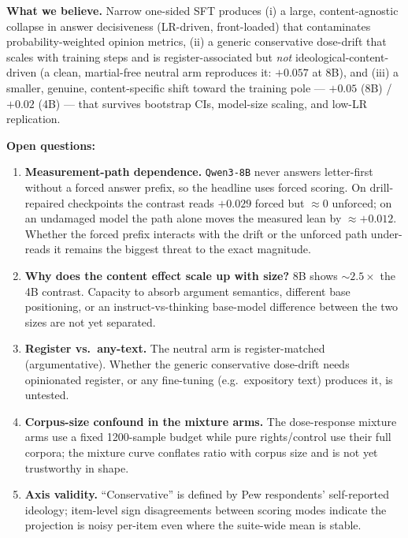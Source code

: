 \documentclass[11pt]{article}
\begin{document}
\textbf{What we believe.} Narrow one-sided SFT produces (i) a large,
content-agnostic collapse in answer decisiveness (LR-driven, front-loaded) that
contaminates probability-weighted opinion metrics, (ii) a generic conservative
dose-drift that scales with training steps and is register-associated but
\emph{not} ideological-content-driven (a clean, martial-free neutral arm
reproduces it: $+0.057$ at 8B), and (iii) a smaller, genuine, content-specific
shift toward the training pole --- $+0.05$ (8B) / $+0.02$ (4B) --- that survives
bootstrap CIs, model-size scaling, and low-LR replication.

\textbf{Open questions:}
\begin{enumerate}
  \item \textbf{Measurement-path dependence.} \texttt{Qwen3-8B} never answers
        letter-first without a forced answer prefix, so the headline uses forced
        scoring. On drill-repaired checkpoints the contrast reads $+0.029$ forced
        but $\approx 0$ unforced; on an undamaged model the path alone moves the
        measured lean by $\approx +0.012$. Whether the forced prefix interacts
        with the drift or the unforced path under-reads it remains the biggest
        threat to the exact magnitude.
  \item \textbf{Why does the content effect scale up with size?} 8B shows
        $\sim 2.5\times$ the 4B contrast. Capacity to absorb argument semantics,
        different base positioning, or an instruct-vs-thinking base-model
        difference between the two sizes are not yet separated.
  \item \textbf{Register vs.\ any-text.} The neutral arm is register-matched
        (argumentative). Whether the generic conservative dose-drift needs
        opinionated register, or any fine-tuning (e.g.\ expository text) produces
        it, is untested.
  \item \textbf{Corpus-size confound in the mixture arms.} The dose-response
        mixture arms use a fixed 1200-sample budget while pure rights/control use
        their full corpora; the mixture curve conflates ratio with corpus size and
        is not yet trustworthy in shape.
  \item \textbf{Axis validity.} ``Conservative'' is defined by Pew respondents'
        self-reported ideology; item-level sign disagreements between scoring
        modes indicate the projection is noisy per-item even where the suite-wide
        mean is stable.
\end{enumerate}
\end{document}
